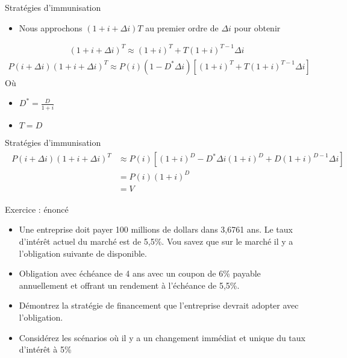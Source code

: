 \documentclass{beamer}
\begin{document}
\begin{frame}{Stratégies d'immunisation}
\begin{itemize}
\item Nous approchons $(1 + i + \Delta i) T$ au premier ordre de $\Delta i$ pour obtenir 
\end{itemize}
\begin{align*}
(1+i+\Delta i)^T \approx (1+i)^T+T(1+i)^{T-1} \Delta i
\end{align*}
\begin{align*}
P(i+\Delta i)(1+i+\Delta i)^T \approx P(i)(1-D^* \Delta i) \left[ (1+i)^T+T(1+i)^{T-1} \Delta i\right]
\end{align*}
Où 
\begin{itemize}[label=\bullet]
\item $D^*= \frac{D}{1+i}$
\item $T=D$
\end{itemize}
\end{frame}

\begin{frame}{Stratégies d'immunisation}
\begin{align*}
\begin{split}
P(i+\Delta i)(1+i+\Delta i)^T & \approx P(i) \left[(1+i)^D-D^* \Delta i (1+i)^D+D(1+i)^{D-1} \Delta i\right] \\  &  =  P(i)(1+i)^D \\ &  = V
\end{split}
\end{align*}

\end{frame}

\begin{frame}{Exercice : énoncé}
\begin{itemize}[label=\bullet]
\item Une entreprise doit payer 100 millions de dollars dans 3,6761 ans. Le taux d'intérêt actuel du marché est de 5,5\%.  Vou savez que sur le marché il  y a l'obligation suivante de disponible.
\item Obligation avec échéance de 4 ans avec un coupon de 6\% payable annuellement et offrant un rendement à l'échéance de 5,5\%.
\item Démontrez la stratégie de financement que l'entreprise devrait adopter avec l'obligation. 
\item Considérez les scénarios où il y a un changement immédiat et unique du taux d'intérêt à 5\% 
\end{itemize}
\end{frame}
\end{document}
